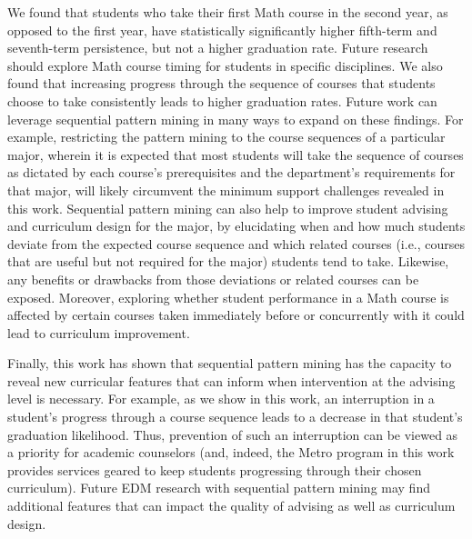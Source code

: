 \documentclass[conference]{IEEEtran}
\begin{document}
We found that students who take their first Math course in the second year, as opposed to the first year, have statistically significantly higher fifth-term and seventh-term persistence, but not a higher graduation rate.  Future research should explore Math course timing for students in specific disciplines.  We also found that increasing progress through the sequence of courses that students choose to take consistently leads to higher graduation rates.  Future work can leverage sequential pattern mining in many ways to expand on these findings.  For example, restricting the pattern mining to the course sequences of a particular major, wherein it is expected that most students will take the sequence of courses as dictated by each course's prerequisites and the department's requirements for that major, will likely circumvent the minimum support challenges revealed in this work.  Sequential pattern mining can also help to improve student advising and curriculum design for the major, by elucidating when and how much students deviate from the expected course sequence and which related courses (i.e., courses that are useful but not required for the major) students tend to take.  Likewise, any benefits or drawbacks from those deviations or related courses can be exposed.  Moreover, exploring whether student performance in a Math course is affected by certain courses taken immediately before or concurrently with it could lead to curriculum improvement. 

Finally, this work has shown that sequential pattern mining has the capacity to reveal new curricular features that can inform when intervention at the advising level is necessary.  For example, as we show in this work, an interruption in a student's progress through a course sequence leads to a decrease in that student's graduation likelihood.  Thus, prevention of such an interruption can be viewed as a priority for academic counselors (and, indeed, the Metro program in this work provides services geared to keep students progressing through their chosen curriculum). Future EDM research with sequential pattern mining may find additional features that can impact the quality of advising as well as curriculum design.
\end{document}
